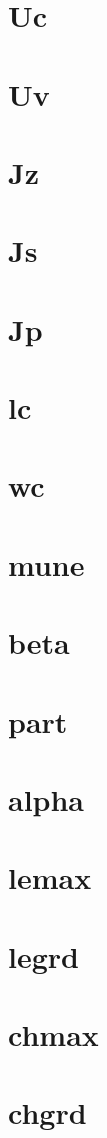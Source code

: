 \documentclass[10pt]{book}
\begin{document}
\section{Uc}
\section{Uv}
\section{Jz}
\section{Js}
\section{Jp}
\section{lc}
\section{wc}
\section{mune}
\section{beta}
\section{part}
\section{alpha}
\section{lemax}
\section{legrd}
\section{chmax}
\section{chgrd}
\end{document}
